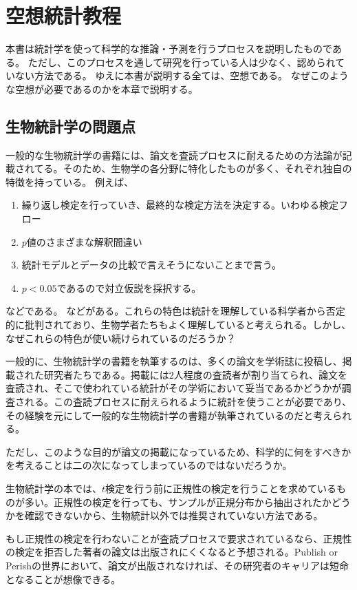 \chapter{空想統計教程}
本書は統計学を使って科学的な推論・予測を行うプロセスを説明したものである。
ただし、このプロセスを通して研究を行っている人は少なく、認められていない方法である。
ゆえに本書が説明する全ては、空想である。
なぜこのような空想が必要であるのかを本章で説明する。

\section{生物統計学の問題点}
一般的な生物統計学の書籍には、論文を査読プロセスに耐えるための方法論が記載されてる。そのため、生物学の各分野に特化したものが多く、それぞれ独自の特徴を持っている。
例えば、
\begin{enumerate}
    \item 繰り返し検定を行っていき、最終的な検定方法を決定する。いわゆる検定フロー
    \item $p$値のさまざまな解釈間違い
    \item 統計モデルとデータの比較で言えそうにないことまで言う。
    \item $p<0.05$であるので対立仮説を採択する。
\end{enumerate}
などである。
などがある。これらの特色は統計を理解している科学者から否定的に批判されており、生物学者たちもよく理解していると考えられる。しかし、なぜこれらの特色が使い続けられているのだろうか？

一般的に、生物統計学の書籍を執筆するのは、多くの論文を学術誌に投稿し、掲載された研究者たちである。掲載には2人程度の査読者が割り当てられ、論文を査読され、そこで使われている統計がその学術において妥当であるかどうかが調査される。この査読プロセスに耐えられるように統計を使うことが必要であり、その経験を元にして一般的な生物統計学の書籍が執筆されているのだと考えられる。

ただし、このような目的が論文の掲載になっているため、科学的に何をすべきかを考えることは二の次になってしまっているのではないだろうか。


生物統計学の本では、$t$検定を行う前に正規性の検定を行うことを求めているものが多い。正規性の検定を行っても、サンプルが正規分布から抽出されたかどうかを確認できないから、生物統計以外では推奨されていない方法である。

もし正規性の検定を行わないことが査読プロセスで要求されているなら、正規性の検定を拒否した著者の論文は出版されにくくなると予想される。Publish or Perishの世界において、論文が出版されなければ、その研究者のキャリアは短命となることが想像できる。

